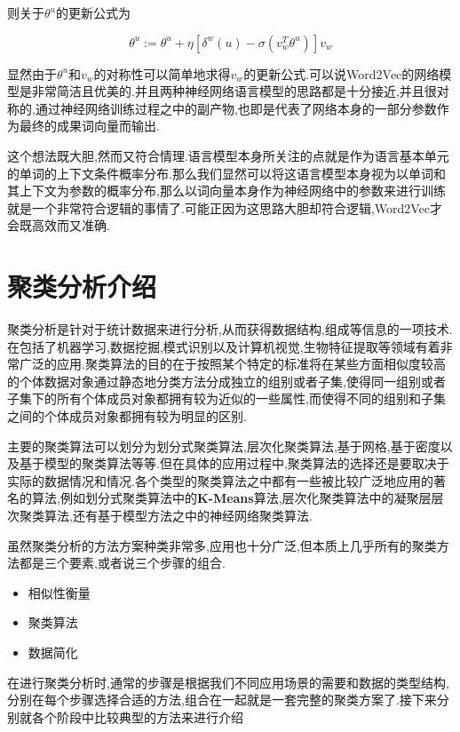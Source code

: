 则关于$\theta^u$的更新公式为

\begin{equation}
	\theta^u := \theta^u + \eta [\delta^{w}(u)-\sigma(v_w^{T}\theta^{u})]v_w 
\end{equation}

显然由于$\theta^u$和$v_w$的对称性可以简单地求得$v_w$的更新公式.可以说Word2Vec的网络模型是非常简洁且优美的.并且两种神经网络语言模型的思路都是十分接近,并且很对称的,通过神经网络训练过程之中的副产物,也即是代表了网络本身的一部分参数作为最终的成果词向量而输出.

这个想法既大胆,然而又符合情理.语言模型本身所关注的点就是作为语言基本单元的单词的上下文条件概率分布.那么我们显然可以将这语言模型本身视为以单词和其上下文为参数的概率分布,那么以词向量本身作为神经网络中的参数来进行训练就是一个非常符合逻辑的事情了.可能正因为这思路大胆却符合逻辑,Word2Vec才会既高效而又准确.

\section{聚类分析介绍}
\label{sec:cluster}

聚类分析是针对于统计数据来进行分析,从而获得数据结构,组成等信息的一项技术.在包括了机器学习,数据挖掘,模式识别以及计算机视觉,生物特征提取等领域有着非常广泛的应用.聚类算法的目的在于按照某个特定的标准将在某些方面相似度较高的个体数据对象通过静态地分类方法分成独立的组别或者子集,使得同一组别或者子集下的所有个体成员对象都拥有较为近似的一些属性,而使得不同的组别和子集之间的个体成员对象都拥有较为明显的区别.

主要的聚类算法可以划分为划分式聚类算法,层次化聚类算法,基于网格,基于密度以及基于模型的聚类算法等等.但在具体的应用过程中,聚类算法的选择还是要取决于实际的数据情况和情况.各个类型的聚类算法之中都有一些被比较广泛地应用的著名的算法,例如划分式聚类算法中的\textbf{K-Means}算法,层次化聚类算法中的凝聚层层次聚类算法,还有基于模型方法之中的神经网络聚类算法.

虽然聚类分析的方法方案种类非常多,应用也十分广泛,但本质上几乎所有的聚类方法都是三个要素,或者说三个步骤的组合.

\begin{itemize}
	\item 
		相似性衡量
	\item
		聚类算法
	\item
		数据简化
\end{itemize}

在进行聚类分析时,通常的步骤是根据我们不同应用场景的需要和数据的类型结构,分别在每个步骤选择合适的方法,组合在一起就是一套完整的聚类方案了.接下来分别就各个阶段中比较典型的方法来进行介绍

